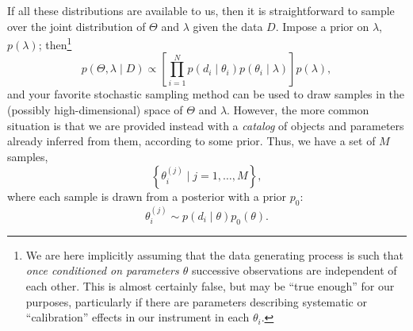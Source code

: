 \documentclass[modern]{aastex63}
\begin{document}
If all these distributions are available to us, then it is straightforward to
sample over the joint distribution of $\Theta$ and $\lambda$ given the data $D$.
Impose a prior on $\lambda$, $p\left( \lambda \right)$; then\footnote{We are
here implicitly assuming that the data generating process is such that
\emph{once conditioned on parameters $\theta$} successive observations are
independent of each other.  This is almost certainly false, but may be ``true
enough'' for our purposes, particularly if there are parameters describing
systematic or ``calibration'' effects in our instrument in each $\theta_i$.}
%
\begin{equation}
  \label{eq:joint-posterior}
  p\left( \Theta, \lambda \mid D \right) \propto \left[ \prod_{i=1}^N p\left( d_i \mid \theta_i \right) p\left( \theta_i \mid \lambda \right) \right] p\left( \lambda \right),
\end{equation}
%
and your favorite stochastic sampling method\texttrademark{} can be used to draw
samples in the (possibly high-dimensional) space of $\Theta$ and $\lambda$.
However, the more common situation is that we are provided instead with a
\emph{catalog} of objects and parameters already inferred from them, according
to some prior.  Thus, we have a set of $M$ samples,
%
\begin{equation}
  \left\{ \theta_i^{(j)} \mid j = 1, \ldots, M \right\},
\end{equation}
%
where each sample is drawn from a posterior with a prior $p_0$:
%
\begin{equation}
  \theta_i^{(j)} \sim p\left( d_i \mid \theta \right) p_0\left(\theta \right).
\end{equation}
\end{document}
